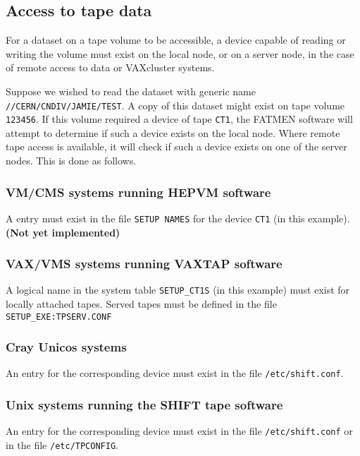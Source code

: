 \subsection{Access to tape data}
\par
For a dataset on a tape volume to be accessible, a device capable
of reading or writing the volume must exist on the local node,
or on a server node, in the case of remote access to data or VAXcluster systems.
\par
Suppose we wished to read the dataset with generic name 
{\tt //CERN/CNDIV/JAMIE/TEST}. A copy of this dataset might
exist on tape volume {\tt 123456}. If this volume required a device
of tape {\tt CT1}, the FATMEN software will attempt to determine
if such a device exists on the local node. Where remote tape access
is available, it will check if such a device exists on one of the
server nodes. This is done as follows.
\subsubsection{VM/CMS systems running HEPVM software}
A entry must exist in the file {\tt SETUP~NAMES}
for the device {\tt CT1} (in this example). {\bf (Not yet implemented)}
\subsubsection{VAX/VMS systems running VAXTAP software}
A logical name in the system table {\tt SETUP\_CT1S} (in this example)
must exist for locally attached tapes. Served tapes must be defined
in the file {\tt SETUP\_EXE:TPSERV.CONF}
\subsubsection{Cray Unicos systems}
An entry for the corresponding device must exist
in the file {\tt /etc/shift.conf}.
\subsubsection{Unix systems running the SHIFT tape software}
An entry for the corresponding
device must exist in the file {\tt /etc/shift.conf} or in the file {\tt /etc/TPCONFIG}.
